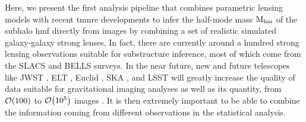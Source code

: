 Here, we present the first analysis pipeline that combines parametric lensing models with recent \gls*{tmnre} developments to infer the half-mode mass $\mathrm{M_{hm}}$ of the subhalo \gls*{hmf} directly from images by combining a set of realistic simulated galaxy-galaxy strong lenses, 
In fact, there are currently around a hundred strong lensing observations suitable for substructure inference, most of which come from the SLACS \cite{Bolton:2005nf} and BELLS \cite{BOSS:2011bef} surveys. In the near future, new and future telescopes like JWST \cite{Gardner:2006ky}, ELT \cite{Simon:2019aa}, Euclid \cite{Refregier:2010ss, EUCLID:2011zbd}, SKA \cite{Koopmans:2004gf}, and LSST \cite{LSSTDarkEnergyScience:2020oya} will greatly increase the quality of data suitable for gravitational imaging analyses as well as its quantity, from $\order{100}$ to $\order{10^5}$ images \cite{Collett:2015roa, McKean:2015aa}. It is then extremely important to be able to combine the information coming from different observations in the statistical analysis.

